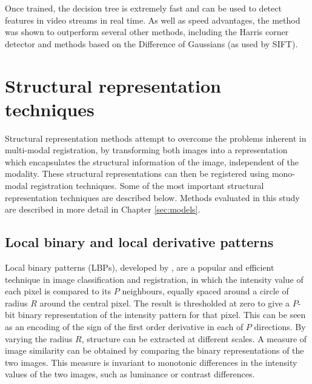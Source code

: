 \documentclass{report}
\begin{document}
Once trained, the decision tree is extremely fast and can be used to detect features in video streams in real time. As well as speed advantages, the method was shown to outperform several other methods, including the Harris corner detector and methods based on the Difference of Gaussians (as used by SIFT).

%

\section{Structural representation techniques}
\label{sec:backgroundSR}
Structural representation methods attempt to overcome the problems inherent in multi-modal registration, by transforming both images into a representation which encapsulates the structural information of the image, independent of the modality. These structural representations can then be registered using mono-modal registration techniques. Some of the most important structural representation techniques are described below. Methods evaluated in this study are described in more detail in Chapter \ref{sec:models}.

\subsection{Local binary and local derivative patterns}
Local binary patterns (LBPs), developed by \cite{ojala2002multiresolution}, are a popular and efficient technique in image classification and registration, %
in which the intensity value of each pixel is compared to its $P$ neighbours, equally spaced around a circle of radius $R$ around the central pixel. The result is thresholded at zero to give a $P$-bit binary representation of the intensity pattern for that pixel. This can be seen as an encoding of the sign of the first order derivative in each of $P$ directions. By varying the radius $R$, structure can be extracted at different scales. A measure of image similarity can be obtained by comparing the binary representations of the two images. This measure is invariant to monotonic differences in the intensity values of the two images, such as luminance or contrast differences.
\end{document}
